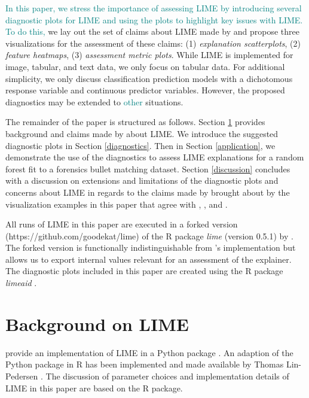 \documentclass[AMS,STIX2COL]{WileyNJD-v2}\usepackage[]{graphicx}\usepackage[]{color}
\newcommand{\kge}[1]{\textcolor{teal}{#1}}
\renewcommand{\sout}[1]{\unskip}
\begin{document}
\kge{In this paper, we stress the importance of assessing LIME by introducing several diagnostic plots for LIME and using the plots to highlight key issues with LIME.} \sout{As a result of the various ways LIME can fail, it is important to assess LIME explanations. We suggest the use of visual diagnostics for assessment. In this paper,} \kge{To do this,} we lay out the set of claims about LIME made by \citet{ribeiro:2016} and propose three visualizations for the assessment of these claims: (1) \emph{explanation scatterplots}, (2) \emph{feature heatmaps}, (3) \emph{assessment metric plots}. While LIME is implemented for image, tabular, and text data, we only focus on tabular data. For additional simplicity, we only discuss classification prediction models with a dichotomous response variable and continuous predictor variables. However, the proposed diagnostics may be extended to \kge{other} \sout{a wider range of} situations.

The remainder of the paper is structured as follows. Section \ref{background} provides background and claims made by \citet{ribeiro:2016} about LIME. We introduce the suggested diagnostic plots in Section \ref{diagnostics}. Then in Section \ref{application}, we demonstrate the use of the diagnostics to assess LIME explanations for a random forest  fit to a forensics bullet matching dataset. Section \ref{discussion} concludes with a discussion on extensions and limitations of the diagnostic plots and concerns about LIME in regards to the claims made by \citet{ribeiro:2016} brought about by the visualization examples in this paper that agree with \citet{alvarezmelis:2018}, \citet{laugel:2018}, and \citet{molnar:2019}.

All runs of LIME in this paper are executed in a forked version (https://github.com/goodekat/lime) of the R package \emph{lime} (version 0.5.1) by \citet{pedersen:2020}. The forked version is functionally indistinguishable from \citeauthor{pedersen:2020}'s implementation but allows us to export internal values relevant for an assessment of the explainer. The diagnostic plots included in this paper are created using the R package \emph{limeaid} \citep{goode:2020}.

\section{Background on LIME} \label{background}

\citet{ribeiro:2016} provide an implementation of LIME in a Python package \cite{ribeiro:2020}. An adaption of the Python package in R has been implemented and made available by Thomas Lin-Pedersen \citep{pedersen:2020}. The discussion of parameter choices and implementation details of LIME in this paper are based on the R package.
\end{document}
